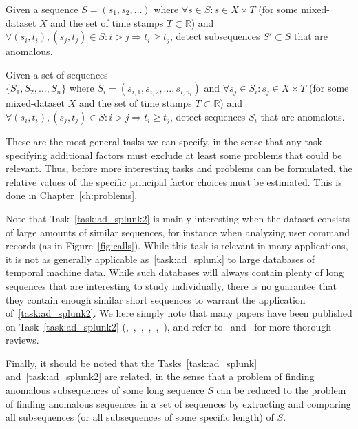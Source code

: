 \begin{task}
\label{task:ad_splunk}
  Given a sequence $S = (s_1, s_2, \dots)$ where $\forall s \in S: s \in X \times T$ (for some mixed-dataset $X$ and the set of time stamps $T \subset \mathbb{R}$) and $\forall (s_i, t_i), (s_j, t_j) \in S: i > j \Rightarrow t_i \geq t_j$, detect subsequences $S' \subset S$ that are anomalous.
\end{task}
\begin{task}
\label{task:ad_splunk2}
  Given a set of sequences\\ $\{S_1, S_2, \dots, S_n\}$ where $S_i = (s_{i,1}, s_{i,2}, \dots, s_{i, n_i})$ and $\forall s_j \in S_i: s_j \in X \times T$ (for some mixed-dataset $X$ and the set of time stamps $T \subset \mathbb{R}$) and $\forall (s_i, t_i), (s_j, t_j) \in S: i > j \Rightarrow t_i \geq t_j$, detect sequences $S_i$ that are anomalous.
\end{task}

These are the most general tasks we can specify, in the sense that any task specifying additional factors must exclude at least some problems that could be relevant. Thus, before more interesting tasks and problems can be formulated, the relative values of the specific principal factor choices must be estimated. This is done in Chapter~\ref{ch:problems}.

Note that Task~\ref{task:ad_splunk2} is mainly interesting when the dataset consists of large amounts of similar sequences, for instance when analyzing user command records (as in Figure~\ref{fig:calls}). While this task is relevant in many applications, it is not as generally applicable as~\ref{task:ad_splunk} to large databases of temporal machine data. While such databases will always contain plenty of long sequences that are interesting to study individually, there is no guarantee that they contain enough similar short sequences to warrant the application of~\ref{task:ad_splunk2}. We here simply note that many papers have been published on Task~\ref{task:ad_splunk2} (\cite{blender},~\cite{chan},~\cite{ye},~\cite{forrest},~\cite{sekar1},~\cite{sekar2}), and refer to~\cite{chandola2} and~\cite{chandola3} for more thorough reviews.

Finally, it should be noted that the Tasks~\ref{task:ad_splunk} and~\ref{task:ad_splunk2} are related, in the sense that a problem of finding anomalous subsequences of some long sequence $S$ can be reduced to the problem of finding anomalous sequences in a set of sequences by extracting and comparing all subsequences (or all subsequences of some specific length) of $S$.

